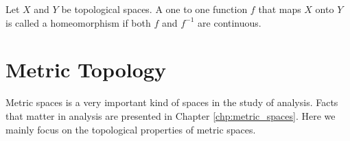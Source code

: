 \begin{defn}
Let $X$ and $Y$ be topological spaces. A one to one function $f$ that maps 
$X$ onto $Y$ is called a homeomorphism if both $f$ and $f^{-1}$ are 
continuous. 
\end{defn}

\section{Metric Topology}
Metric spaces is a very important kind of spaces in the study of analysis. 
Facts that matter in analysis are presented in Chapter 
\ref{chp:metric_spaces}. 
Here we mainly focus on the topological properties of metric spaces. 
